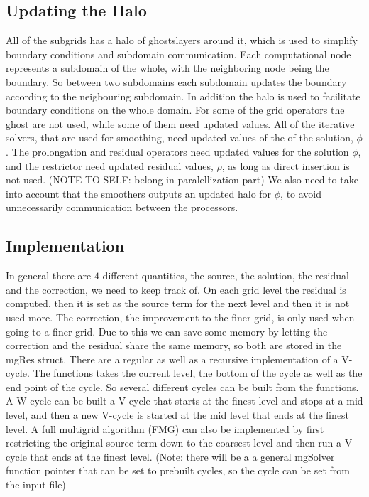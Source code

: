 		\subsection{Updating the Halo}
		All of the subgrids has a halo of ghostslayers around it, which is used to simplify boundary conditions and subdomain communication. Each computational node
		represents a subdomain of the whole, with the neighboring node being the boundary. So between two subdomains each subdomain updates the boundary according to
		the neigbouring subdomain. In addition the halo is used to facilitate boundary conditions on the whole domain. For some of the grid operators
		the ghost are not used, while some of them need updated values. All of the iterative solvers, that are used
		for smoothing, need updated values of the of the solution, \(\phi\). The prolongation and residual operators need updated values
		for the solution \(\phi\), and the restrictor need updated residual values, \(\rho\), as long as direct insertion is not used. (NOTE TO SELF: belong in paralellization part)
		We also need to take into account that the smoothers outputs an updated halo for \(\phi\), to avoid
		unnecessarily communication between the processors.

		\subsection{Implementation}
			In general there are \(4\) different quantities, the source, the solution, the residual and the correction, we need to keep track of.
			On each grid level the residual is computed, then it is set as the source term for the next level and then it is not used more.
			The correction, the improvement to the finer grid, is only used when going to a finer grid. Due to this we can save some memory by
			letting the correction and the residual share the same memory, so both are stored in the mgRes struct. There are a regular as well as a recursive implementation
			of a V-cycle. The functions takes the current level, the bottom of the cycle as well as the end point of the cycle. So several different cycles
			can be built from the functions. A W cycle can be built a V cycle that starts at the finest level and stops at a mid level, and then a new V-cycle is started at
			the mid level that ends at the finest level. A full multigrid algorithm (FMG) can also be implemented by first restricting the original source term down to the coarsest
			level and then run a V-cycle that ends at the finest level.
			(Note: there will be a a general mgSolver function pointer that can be set to prebuilt cycles, so the cycle can be set from the input file)

